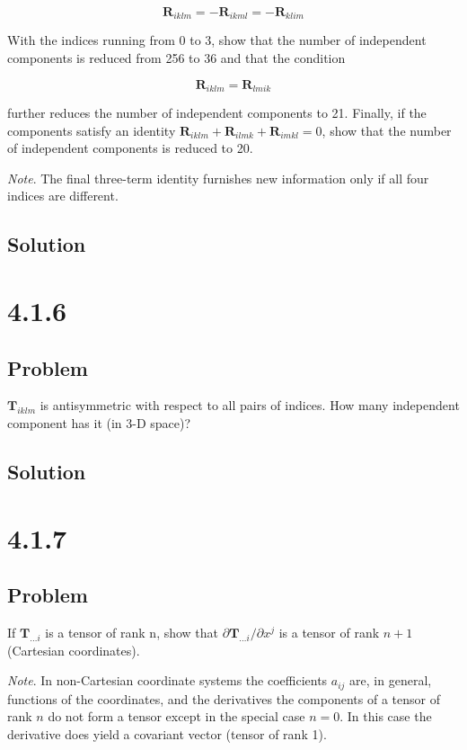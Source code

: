 \documentclass[12pt]{article}
\begin{document}
\[
    \textbf{R}_{iklm} = - \textbf{R}_{ikml} = - \textbf{R}_{klim}
\]

With the indices running from 0 to 3, show that the number of independent components
is reduced from 256 to 36 and that the condition

\[
    \textbf{R}_{iklm} = \textbf{R}_{lmik}
\]

further reduces the number of independent components to 21. Finally, if the components
satisfy an identity \(\textbf{R}_{iklm} + \textbf{R}_{ilmk} + \textbf{R}_{imkl} = 0\),
show that the number of independent components is reduced to 20.

\textit{Note}. The final three-term identity furnishes new
information only if all four indices are different.

\subsection{Solution}

\newpage
\section{4.1.6}

\subsection{Problem}

\(\textbf{T}_{iklm}\) is antisymmetric with respect to all pairs of indices. How many
independent component has it (in 3-D space)?

\subsection{Solution}

\newpage
\section{4.1.7}

\subsection{Problem}

If \(\textbf{T}_{\ldots i}\) is a tensor of rank n, show that
\(\partial \textbf{T}_{\ldots i} / \partial x^j\) is a tensor of rank \(n + 1\)
(Cartesian coordinates).

\textit{Note}. In non-Cartesian coordinate systems the coefficients \(a_{ij}\) are, in general,
functions of the coordinates, and the derivatives the components of a tensor of rank \(n\) do
not form a tensor except in the special case \(n = 0\). In this case the derivative does yield a
covariant vector (tensor of rank 1).
\end{document}
